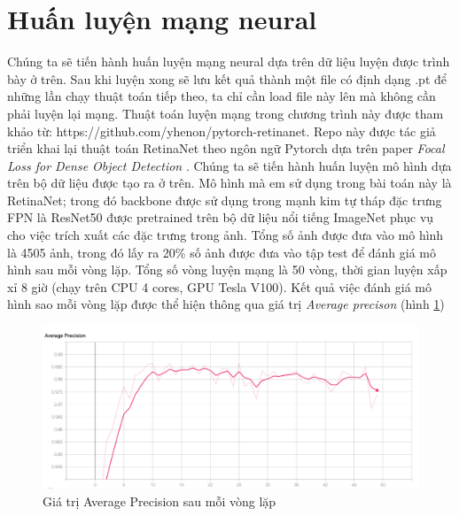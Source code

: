 \documentclass[a4paper, 12pt]{report}
\begin{document}
\section{Huấn luyện mạng neural}

Chúng ta sẽ tiến hành huấn luyện mạng neural dựa trên dữ liệu luyện được trình bày ở trên. Sau khi luyện xong sẽ lưu kết quả thành một file có định dạng .pt để những lần chạy thuật toán tiếp theo, ta chỉ cần load file này lên mà không cần phải luyện lại mạng. Thuật toán luyện mạng trong chương trình này được tham khảo từ: https://github.com/yhenon/pytorch-retinanet.  Repo này được tác giả triển khai lại thuật toán RetinaNet theo ngôn ngữ Pytorch dựa trên paper \textit{Focal Loss for Dense Object Detection} \cite{floss}.
Chúng ta sẽ tiến hành huấn luyện mô hình dựa trên bộ dữ liệu được tạo ra ở trên.  Mô hình mà em sử dụng trong bài toán này là RetinaNet; trong đó backbone được sử dụng trong mạnh kim tự tháp đặc trưng FPN là ResNet50 được pretrained trên bộ dữ liệu nổi tiếng ImageNet phục vụ cho việc trích xuất các đặc trưng trong ảnh. Tổng số ảnh được đưa vào mô hình là 4505 ảnh,  trong đó lấy ra 20\% số ảnh được đưa vào tập test để đánh giá mô hình sau mỗi vòng lặp. Tổng số vòng luyện mạng là 50 vòng, thời gian luyện xấp xỉ 8 giờ (chạy trên CPU 4 cores,  GPU  Tesla V100).  Kết quả việc đánh giá mô hình sao mỗi vòng lặp được thể hiện thông qua giá trị \textit{Average precison} (hình \ref{fig:mAPplot}) %
\begin{figure}
\centering
  \includegraphics[width=1\linewidth]{Images/mAPplot}
  \caption{Giá trị Average Precision sau mỗi vòng lặp}
\label{fig:mAPplot}
\end{figure}
\end{document}
